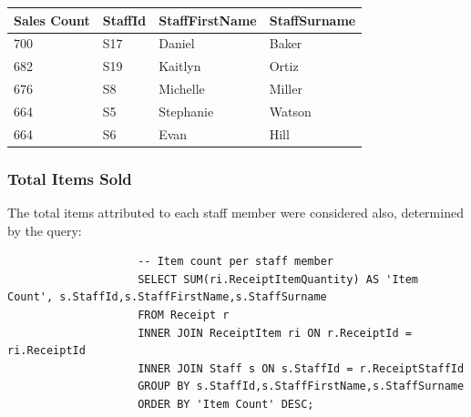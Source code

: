 \documentclass{article}
\begin{document}
                \begin{table}[H]
                    \centering
                    \begin{tabular}{|l|l|l|l|}
                    \hline
                    Sales Count & StaffId & StaffFirstName & StaffSurname \\ \hline
                    700         & S17     & Daniel         & Baker        \\ \hline
                    682         & S19     & Kaitlyn        & Ortiz        \\ \hline
                    676         & S8      & Michelle       & Miller       \\ \hline
                    664         & S5      & Stephanie      & Watson       \\ \hline
                    664         & S6      & Evan           & Hill         \\ \hline
                    \end{tabular}
                    \end{table}

            \subsubsection{Total Items Sold}
                The total items attributed to each staff member were considered also,
                determined by the query:
                
                \begin{lstlisting}
                    -- Item count per staff member
                    SELECT SUM(ri.ReceiptItemQuantity) AS 'Item Count', s.StaffId,s.StaffFirstName,s.StaffSurname
                    FROM Receipt r
                    INNER JOIN ReceiptItem ri ON r.ReceiptId = ri.ReceiptId
                    INNER JOIN Staff s ON s.StaffId = r.ReceiptStaffId
                    GROUP BY s.StaffId,s.StaffFirstName,s.StaffSurname
                    ORDER BY 'Item Count' DESC;
                \end{lstlisting}
\end{document}
